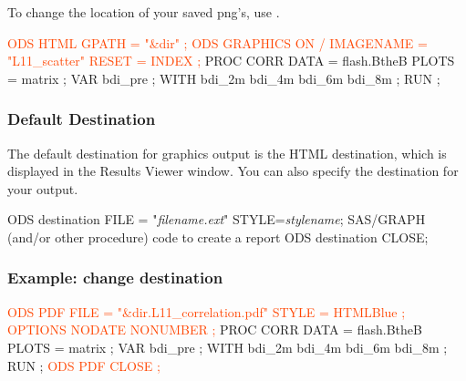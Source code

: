 %
\begin{frame}[fragile]
To change the location of your saved png's, use .
\footnotesize
\begin{code}{.0}
\textcolor{OrangeRed}{ODS HTML GPATH = "&dir" ;}
\textcolor{OrangeRed}{ODS GRAPHICS ON / IMAGENAME = "L11_scatter" RESET = INDEX ;}
PROC CORR DATA = flash.BtheB PLOTS = matrix ;
   VAR bdi_pre ;
   WITH bdi_2m bdi_4m bdi_6m bdi_8m ;
RUN ;
\end{code}
\emp
\end{frame}



\begin{frame}[fragile]
\frametitle{Default Destination}
The default destination for graphics output is the HTML destination, which is displayed in the Results Viewer window.  You can also specify the destination for your output.
\footnotesize
\begin{code}{.0}
ODS destination FILE = "\emph{filename.ext}" STYLE=\emph{stylename};
  SAS/GRAPH (and/or other procedure) code to create a report
ODS destination CLOSE;
\end{code}
\emp
\end{frame}

\begin{frame}[fragile]
\frametitle{Example: change destination}
\footnotesize
\begin{code}{.0}
\textcolor{OrangeRed}{ODS PDF FILE = "&dir.L11_correlation.pdf" STYLE = HTMLBlue ;}
\textcolor{OrangeRed}{OPTIONS NODATE NONUMBER ;}
PROC CORR DATA = flash.BtheB PLOTS = matrix ;
	VAR bdi_pre ;
	WITH bdi_2m bdi_4m bdi_6m bdi_8m ;
RUN ;
\textcolor{OrangeRed}{ODS PDF CLOSE ;}
\end{code}
\emp
\end{frame}







 